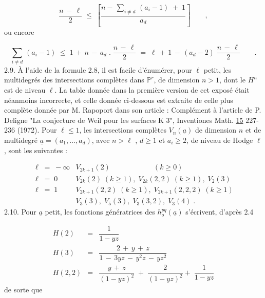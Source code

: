 \begin{equation*}
\frac{n \, - \, \ell}{2} \;\leq\; \left[ \frac{n - \, \sum_{i \neq d} \, (a_i - 1) \; + \; 1}{a_d} \right] \qquad ,
\end{equation*}
ou encore

\begin{equation*}
\sum_{i \neq d} \, (a_i - 1) \;\leq\; 1 \, + \, n \, - \, a_d \; . \; \frac{n \, - \, \ell}{2} \;=\; \ell \, + \, 1 \, - \, (a_d - 2) \; \frac{n \, - \, \ell}{2} \qquad .
\end{equation*}
2.9. \quad À l'aide de la formule 2.8, il est facile d'énumérer, pour $\ell$ petit, les multidegrés des intersections complètes dans $\mathbb{P}^r$, de dimension $n > 1$, dont le $H^n$ est de niveau $\ell$. La table donnée dans la première version de cet exposé était néanmoins incorrecte, et celle donnée ci-dessous est extraite de celle plus complète donnée par M. Rapoport dans son article : Complément à l'article de P. Deligne "La conjecture de Weil pour les surfaces K 3", Inventiones Math. \underline{15} 227-236 (1972). Pour $\ell \leq 1$, les intersections complètes $V_n(\underline{a})$ de dimension $n$ et de multidegré $\underline{a} = (a_1,\ldots,a_d)$, avec $n > \ell$ , $d \geq 1$ et $a_i \geq 2$, de niveau de Hodge $\ell$ , sont les suivantes :



\begin{equation*}
\begin{array}{ll}
\ell \;=\; -\infty & V_{2k+1}(2) \qquad\qquad\qquad (k \geq 0) \\[2ex]
\ell \;=\; 0 & V_{2k}(2) \; (k \geq 1), \; V_{2k}(2,2) \; (k \geq 1), \; V_2(3) \\[2ex]
\ell \;=\; 1 & V_{2k+1}(2,2) \; (k \geq 1), \; V_{2k+1}(2,2,2) \; (k \geq 1) \\
& V_3(3), \; V_5(3), \; V_3(3,2), \; V_3(4) \; .
\end{array}
\end{equation*}
2.10. \quad Pour $\underline{a}$ petit, les fonctions génératrices des $h_o^{pq}(\underline{a})$ s'écrivent, d'après 2.4

\begin{equation*}
\begin{array}{rcl}
H(2) & = & \dfrac{1}{1-yz} \\[3ex]
H(3) & = & \dfrac{2 \, + \, y \, + \, z}{1 \, - \, 3yz \, - \, y^2 z \, - \, yz^2} \\[3ex]
H(2,2) & = & \dfrac{y \, + \, z}{(1-yz)^2} \; + \; \dfrac{2}{(1-yz)^2} + \; \dfrac{1}{1-yz}
\end{array}
\end{equation*}
de sorte que

